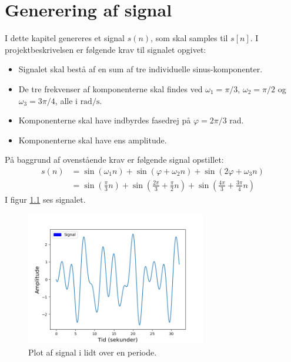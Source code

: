 \chapter{Generering af signal}
I dette kapitel genereres et signal $s(n)$, som skal samples til $s[n]$. I projektbeskrivelsen er følgende krav til signalet opgivet:
\begin{itemize}
\setlength\itemsep{0em}
\item Signalet skal bestå af en sum af tre individuelle sinus-komponenter.
\item De tre frekvenser af komponenterne skal findes ved $\omega_1=\pi/3$, $\omega_2=\pi/2$ og $\omega_3=3\pi/4$, alle i $\text{rad}/\text{s}$.
\item Komponenterne skal have indbyrdes fasedrej på $\varphi=2\pi/3$ rad.
\item Komponenterne skal have ens amplitude.
\end{itemize}
På baggrund af ovenstående krav er følgende signal opstillet:
\begin{align}
s(n)&=\sin\left(\omega_1n\right)+\sin\left(\varphi+\omega_2n\right)+\sin\left(2\varphi+\omega_3n\right)\\
&=\sin\left(\frac{\pi}{3}n\right)+\sin\left(\frac{2\pi}{3}+\frac{\pi}{2}n\right)+\sin\left(\frac{4\pi}{3}+\frac{3\pi}{4}n\right)\label{eq:signal}
\end{align}
I figur \ref{fig:signal} ses signalet.
\begin{figure}[H]
\centering
\includegraphics[width=0.7\textwidth]{figures/signal.png}
\caption{Plot af signal i lidt over en periode.}
\label{fig:signal}
\end{figure}

